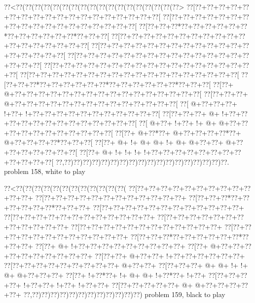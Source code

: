 \vbox{\vbox{\goo
\0??<\0??(\0??(\0??(\0??(\0??(\0??(\0??(\0??(\0??(\0??(\0??(\0??(\0??(\0??(\0??(\0??(\0??(\0??>
\0??[\0??+\0??+\0??+\0??+\0??+\0??+\0??+\0??+\0??+\0??+\0??+\0??+\0??+\0??+\0??+\0??+\0??+\0??[
\0??[\0??+\0??+\0??+\0??+\0??+\0??+\0??+\0??+\0??+\0??+\0??+\0??+\0??+\0??+\0??+\0??+\0??+\0??[
\0??[\0??+\0??+\0??*\0??+\0??+\0??+\0??+\0??+\0??*\0??+\0??+\0??+\0??+\0??+\0??*\0??+\0??+\0??[
\0??[\0??+\0??+\0??+\0??+\0??+\0??+\0??+\0??+\0??+\0??+\0??+\0??+\0??+\0??+\0??+\0??+\0??+\0??[
\0??[\0??+\0??+\0??+\0??+\0??+\0??+\0??+\0??+\0??+\0??+\0??+\0??+\0??+\0??+\0??+\0??+\0??+\0??[
\0??[\0??+\0??+\0??+\0??+\0??+\0??+\0??+\0??+\0??+\0??+\0??+\0??+\0??+\0??+\0??+\0??+\0??+\0??[
\0??[\0??+\0??+\0??+\0??+\0??+\0??+\0??+\0??+\0??+\0??+\0??+\0??+\0??+\0??+\0??+\0??+\0??+\0??[
\0??[\0??+\0??+\0??+\0??+\0??+\0??+\0??+\0??+\0??+\0??+\0??+\0??+\0??+\0??+\0??+\0??+\0??+\0??[
\0??[\0??+\0??+\0??*\0??+\0??+\0??+\0??+\0??+\0??*\0??+\0??+\0??+\0??+\0??+\0??*\0??+\0??+\0??[
\0??[\0??+\- @+\0??+\0??+\0??+\0??+\0??+\0??+\0??+\0??+\0??+\0??+\0??+\0??+\0??+\0??+\0??+\0??[
\0??[\0??+\0??+\0??+\- @+\0??+\0??+\0??+\0??+\0??+\0??+\0??+\0??+\0??+\0??+\0??+\0??+\0??+\0??[
\0??[\- @+\0??+\0??+\0??+\- !+\0??+\- !+\0??+\0??+\0??+\0??+\0??+\0??+\0??+\0??+\0??+\0??+\0??[
\0??[\0??+\0??+\0??+\- @+\- !+\0??+\0??+\0??+\0??+\0??+\0??+\0??+\0??+\0??+\0??+\0??+\0??+\0??[
\0??[\- @+\0??+\- !+\0??+\- !+\- @+\- @+\0??+\0??+\0??+\0??+\0??+\0??+\0??+\0??+\0??+\0??+\0??[
\0??[\0??+\- @+\0??*\0??+\- @+\0??+\0??+\0??+\0??*\0??+\- @+\0??+\0??+\0??+\0??*\0??+\0??+\0??[
\0??[\0??+\- @+\- !+\- @+\- @+\- !+\- @+\- @+\0??+\0??+\- @+\0??+\0??+\0??+\0??+\0??+\0??+\0??[
\0??[\0??+\- @+\- !+\- !+\- !+\- !+\0??+\0??+\0??+\0??+\0??+\0??+\0??+\0??+\0??+\0??+\0??+\0??[
\0??,\0??)\0??)\0??)\0??)\0??)\0??)\0??)\0??)\0??)\0??)\0??)\0??)\0??)\0??)\0??)\0??)\0??)\0??.
}
\hfil problem 158, white to play\hfil\break
}

\vbox{\vbox{\goo
\0??<\0??(\0??(\0??(\0??(\0??(\0??(\0??(\0??(\0??(\0??(\0??(\0??(
\0??[\0??+\0??+\0??+\0??+\0??+\0??+\0??+\0??+\0??+\0??+\0??+\0??+
\0??[\0??+\0??+\0??+\0??+\0??+\0??+\0??+\0??+\0??+\0??+\0??+\0??+
\0??[\0??+\0??+\0??*\0??+\0??+\0??+\0??+\0??+\0??*\0??+\0??+\0??+
\0??[\0??+\0??+\0??+\0??+\0??+\0??+\0??+\0??+\0??+\0??+\0??+\0??+
\0??[\0??+\0??+\0??+\0??+\0??+\0??+\0??+\0??+\0??+\0??+\0??+\0??+
\0??[\0??+\0??+\0??+\0??+\0??+\0??+\0??+\0??+\0??+\0??+\0??+\0??+
\0??[\0??+\0??+\0??+\0??+\0??+\0??+\0??+\0??+\0??+\0??+\0??+\0??+
\0??[\0??+\0??+\0??+\0??+\0??+\0??+\0??+\0??+\0??+\0??+\0??+\0??+
\0??[\0??+\0??+\0??*\0??+\0??+\0??+\0??+\0??+\0??*\0??+\0??+\0??+
\0??[\0??+\- @+\- !+\0??+\0??+\0??+\0??+\0??+\0??+\0??+\0??+\0??+
\0??[\0??+\- @+\0??+\0??+\0??+\0??+\0??+\0??+\0??+\0??+\0??+\0??+
\0??[\0??+\0??+\- @+\0??+\0??+\- !+\0??+\0??+\0??+\0??+\0??+\0??+
\0??[\0??+\0??+\0??+\0??+\0??+\0??+\0??+\0??+\0??+\- @+\0??+\0??+
\0??[\0??+\0??+\0??+\- @+\- @+\- !+\- !+\- @+\- @+\0??+\0??+\0??+
\0??[\0??+\- !+\0??*\0??+\- !+\- @+\- @+\- !+\0??*\0??+\- !+\0??+
\0??[\0??+\0??+\0??+\0??+\- !+\0??+\0??+\- !+\0??+\- !+\0??+\0??+
\0??[\0??+\0??+\0??+\0??+\0??+\- @+\- @+\0??+\0??+\0??+\0??+\0??+
\0??,\0??)\0??)\0??)\0??)\0??)\0??)\0??)\0??)\0??)\0??)\0??)\0??)
}
\hfil problem 159, black to play\hfil\break
}

